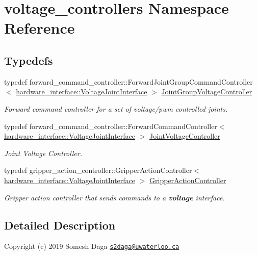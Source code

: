 \hypertarget{namespacevoltage__controllers}{}\section{voltage\+\_\+controllers Namespace Reference}
\label{namespacevoltage__controllers}
\subsection*{Typedefs}
\begin{DoxyCompactItemize}
\item 
typedef forward\+\_\+command\+\_\+controller\+::\+Forward\+Joint\+Group\+Command\+Controller$<$ \hyperlink{classhardware__interface_1_1_voltage_joint_interface}{hardware\+\_\+interface\+::\+Voltage\+Joint\+Interface} $>$ \hyperlink{namespacevoltage__controllers_a468dac184f4bbe17dd09f819c6876ad4}{Joint\+Group\+Voltage\+Controller}
\begin{DoxyCompactList}\small\item\em Forward command controller for a set of voltage/pwm controlled joints. \end{DoxyCompactList}\item 
typedef forward\+\_\+command\+\_\+controller\+::\+Forward\+Command\+Controller$<$ \hyperlink{classhardware__interface_1_1_voltage_joint_interface}{hardware\+\_\+interface\+::\+Voltage\+Joint\+Interface} $>$ \hyperlink{namespacevoltage__controllers_a342a187a35760323139ce1cad77898a6}{Joint\+Voltage\+Controller}
\begin{DoxyCompactList}\small\item\em Joint Voltage Controller. \end{DoxyCompactList}\item 
typedef gripper\+\_\+action\+\_\+controller\+::\+Gripper\+Action\+Controller$<$ \hyperlink{classhardware__interface_1_1_voltage_joint_interface}{hardware\+\_\+interface\+::\+Voltage\+Joint\+Interface} $>$ \hyperlink{namespacevoltage__controllers_a56f9a4de5492f0b87d819d8db50835fd}{Gripper\+Action\+Controller}
\begin{DoxyCompactList}\small\item\em Gripper action controller that sends commands to a {\bfseries voltage} interface. \end{DoxyCompactList}\end{DoxyCompactItemize}


\subsection{Detailed Description}
Copyright (c) 2019 Somesh Daga \href{mailto:s2daga@uwaterloo.ca}{\tt s2daga@uwaterloo.\+ca}

